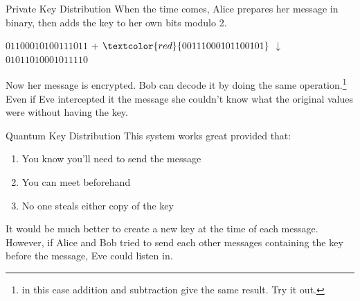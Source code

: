 \documentclass{beamer}
\begin{document}
\begin{frame}{Private Key Distribution}
    When the time comes, Alice prepares her message in binary, then adds the key to her own bits modulo 2.\vfill
    \begin{center}
        \begin{math}
            01100010100111011
        \end{math}\vfill     
        \begin{math}
            +
        \end{math}\vfill
        \begin{math}
            \textcolor{red}{00111000101100101}
        \end{math}\vfill
        \begin{math}
            \downarrow
        \end{math}\vfill
        \begin{math}
            01011010001011110
        \end{math}\vfill
    \end{center}
    \pause
    Now her message is encrypted. Bob can decode it by doing the same operation.\footnote{in this case addition and subtraction give the same result. Try it out.}\vfill
    Even if Eve intercepted it the message she couldn't know what the original values were without having the key.
\end{frame}

\begin{frame}{Quantum Key Distribution}
    This system works great provided that:\vfill
    \begin{enumerate}
        \item You know you'll need to send the message
        \item You can meet beforehand
        \item No one steals either copy of the key
    \end{enumerate}\vfill
    It would be much better to create a new key at the time of each message.\vfill
    However, if Alice and Bob tried to send each other messages containing the key before the message, Eve could listen in.
\end{frame}
\end{document}
